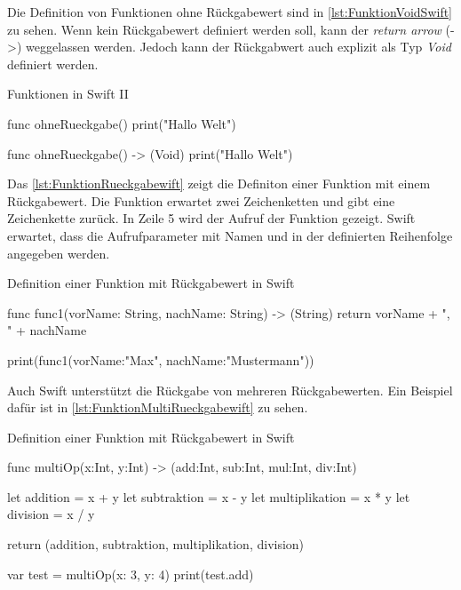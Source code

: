 Die Definition von Funktionen ohne Rückgabewert sind in \autoref{lst:FunktionVoidSwift} zu sehen.
Wenn kein Rückgabewert definiert werden soll, kann der \emph{return arrow} (->) weggelassen werden.
Jedoch kann der Rückgabwert auch explizit als Typ \emph{Void} definiert werden.

\begin{listing}[H]
\caption{Funktionen in Swift II}
\label{lst:FunktionVoidSwift}
\begin{SwiftCode}
func ohneRueckgabe() {
    print("Hallo Welt")
}

func ohneRueckgabe() -> (Void) {
    print("Hallo Welt")
}
\end{SwiftCode}
\end{listing}

Das \autoref{lst:FunktionRueckgabewift} zeigt die Definiton einer Funktion mit einem Rückgabewert. 
Die Funktion erwartet zwei Zeichenketten und gibt eine Zeichenkette zurück.
In Zeile 5 wird der Aufruf der Funktion gezeigt. 
Swift erwartet, dass die Aufrufparameter mit Namen und in der definierten Reihenfolge angegeben werden.

\begin{listing}[H]
\caption{Definition einer Funktion mit Rückgabewert in Swift}
\label{lst:FunktionRueckgabewift}
\begin{SwiftCode}
func func1(vorName: String, nachName: String) -> (String){
    return vorName + ", " + nachName
}

print(func1(vorName:"Max", nachName:"Mustermann"))
\end{SwiftCode}
\end{listing}

Auch Swift unterstützt die Rückgabe von mehreren Rückgabewerten.
Ein Beispiel dafür ist in \autoref{lst:FunktionMultiRueckgabewift} zu sehen. 

\begin{listing}[H]
\caption{Definition einer Funktion mit Rückgabewert in Swift}
\label{lst:FunktionMultiRueckgabewift}
\begin{SwiftCode}
func multiOp(x:Int, y:Int) -> (add:Int, sub:Int, mul:Int, div:Int){
    let addition = x + y
    let subtraktion = x - y
    let multiplikation = x * y
    let division = x / y
	
    return (addition, subtraktion, multiplikation, division)
}

var test = multiOp(x: 3, y: 4)
print(test.add)
\end{SwiftCode}
\end{listing}

